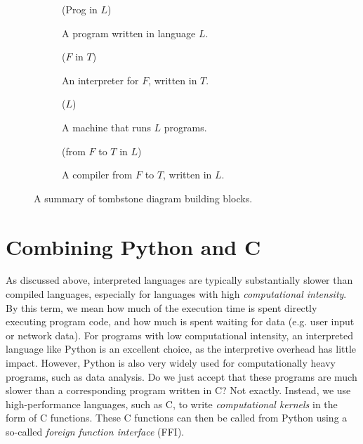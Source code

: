 \begin{figure}[b]
  \centering

  \begin{subfigure}[b]{0.45\textwidth}
    \centering
    \tprog(Prog in $L$)
    \caption{A program written in language
      $L$.}
    \label{fig:tprog}
  \end{subfigure}
  \hfill
  \begin{subfigure}[b]{0.45\textwidth}
    \centering
    \tinter($F$ in $T$)
    \caption{An interpreter for $F$, written in $T$.}
    \label{fig:tinter}
  \end{subfigure}

  \bigskip

  \begin{subfigure}[b]{0.45\textwidth}
    \centering
    \tmachine($L$)
    \caption{A machine that runs $L$ programs.}
    \label{fig:tmachine}
  \end{subfigure}
  \hfill
  \begin{subfigure}[b]{0.45\textwidth}
    \centering
    \tcompiler(from $F$ to $T$ in $L$)
    \caption{A compiler from $F$ to $T$, written in $L$.}
    \label{fig:tcompiler}
  \end{subfigure}

  \caption{A summary of tombstone diagram building blocks.}
  \label{fig:tombstone}
\end{figure}

\section{Combining Python and C}
\label{sec:python-calling-c}

As discussed above, interpreted languages are typically substantially
slower than compiled languages, especially for languages with high
\textit{computational intensity}.  By this term, we mean how much of
the execution time is spent directly executing program code, and how
much is spent waiting for data (e.g. user input or network data).  For
programs with low computational intensity, an interpreted language
like Python is an excellent choice, as the interpretive overhead has
little impact.  However, Python is also very widely used for
computationally heavy programs, such as data analysis.  Do we just
accept that these programs are much slower than a corresponding
program written in C?  Not exactly.  Instead, we use high-performance
languages, such as C, to write \textit{computational kernels} in the
form of C functions.  These C functions can then be called from Python
using a so-called \textit{foreign function interface} (FFI).

